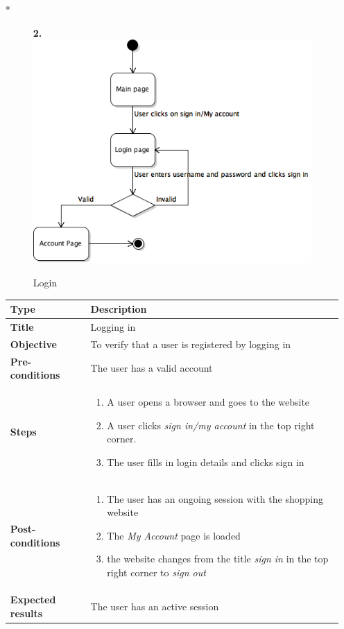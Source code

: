 \documentclass[UKenglish,12pt]{article}
\begin{document}
\begin{itemize}
\item[*]
\begin{figure}[!htbp]
\textbf{2.\newline}
\centering
\includegraphics[scale=0.7,keepaspectratio]{Images/Login.png}
\caption{Login}
\end{figure}



\begin{table}[!htbp]
\small
\begin{tabular}{| p{5cm} | p{10cm} | }
	\hline
	\textbf{Type} & \textbf{Description} \\ \hline
	 \textbf{Title} & Logging in\\ \hline
	 \textbf{Objective} & To verify that a user is registered by logging in\\ \hline
	 \textbf{Pre-conditions} & The user has a valid account\\ \hline
	 \textbf{Steps} & \begin{enumerate} \item A user opens a browser and goes to the website \item A user clicks \textit{sign in/my account} in the top right corner. \item The user fills in login details and clicks sign in \end{enumerate} \\ \hline
	 \textbf{Post-conditions} & \begin{enumerate} \item The user has an ongoing session with the shopping website \item The \textit{My Account} page is loaded \item the website changes from the title \textit{sign in} in the top right corner to \textit{sign out} \end{enumerate} \\ \hline
	 \textbf{Expected results} & The user has an active session  \\ 
	 \hline
\end{tabular} %
\end{table}


\end{itemize}
\end{document}
